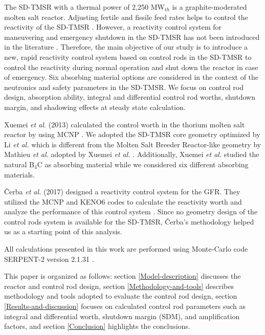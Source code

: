 The SD-TMSR with a thermal power of 2,250 MW$_{th}$ 
\cite{ashraf2020whole,li_optimization_2018} is a graphite-moderated 
molten salt reactor. Adjusting fertile and fissile feed rates helps to control the reactivity of 
the SD-TMSR \cite{ashraf2020whole,ashraf2020Strategies,li_optimization_2018}. However, a reactivity control system for maneuvering and emergency shutdown in the SD-TMSR has not been introduced in the literature \cite{li_optimization_2018,zou2018transition,zhang2020radiotoxicity,jiang2012advanced,zou2018preliminary,ZOU2015114}. Therefore, the main objective of our study is to introduce a new, 
rapid reactivity control system based on control rods in the SD-TMSR to control 
the reactivity during normal operation and shut down the reactor in case of 
emergency. Six absorbing material options are considered in the context of the 
neutronics and safety parameters in the SD-TMSR. We 
focus on control rod design, absorption ability, integral and differential 
control rod worths, shutdown margin, and shadowing 
effects at steady state calculation.

Xuemei \emph{et al.} (2013) calculated the control worth in the thorium molten salt
reactor by using MCNP \cite{briesmeister2000mcnptm}. We adopted the SD-TMSR
core geometry optimized by Li \emph{et al.} \cite{li_optimization_2018} which
is different from the Molten Salt Breeder Reactor-like geometry by Mathieu \emph{et al.}
\cite{mathieu2006thorium} adopted by Xuemei \emph{et al.} \cite{xuemei2013study}.
Additionally, Xuemei \emph{et al.} studied the natural B$_4$C as absorbing material
while we considered six different absorbing materials.

\v{C}erba \emph{et al.} (2017) designed a reactivity control system for the 
GFR. They utilized the MCNP \cite{briesmeister2000mcnptm} and KENO6 codes 
\cite{petrie1984keno} to calculate the reactivity worth and analyze the 
performance of this control system \cite{vcerba2017optimization}. Since no
geometry design of the control rods system is available for the SD-TMSR, 
\v{C}erba's methodology \cite{vcerba2017optimization} helped us as a starting 
point of this analysis.

All calculations presented in this work are performed using Monte-Carlo code SERPENT-2 version 2.1.31 \cite{leppanen2014serpent}.

This paper is organized as follows: section \ref{Model-description} discusses the reactor and control rod design, section \ref{Methodology-and-tools} describes methodology and tools adopted to evaluate the control rod design, section \ref{Results-and-discussion} focuses on calculated control rod parameters such as integral and differential worth, shutdown margin (SDM), and amplification factors, and section \ref{Conclusion} highlights the conclusions.